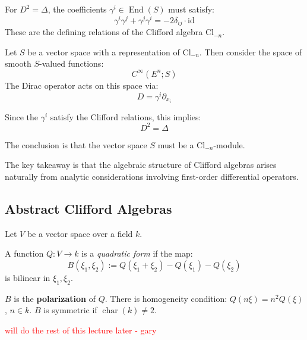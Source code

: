 For $D^2 = \Delta$, the coefficients $\gamma^i \in \operatorname{End}(S)$ must satisfy:
    \begin{equation}
    \gamma^i \gamma^j + \gamma^j \gamma^i = -2\delta_{ij} \cdot \mathrm{id} 
    \end{equation}
These are the defining relations of the Clifford algebra $\mathrm{Cl}_{-n}$.

Let $S$ be a vector space with a representation of $\mathrm{Cl}_{-n}$. Then consider the space of smooth $S$-valued functions:
    \[
    C^\infty(E^n; S)
    \]
The Dirac operator acts on this space via:
    \[
    D = \gamma^i \partial_{x_i}
    \]

Since the $\gamma^i$ satisfy the Clifford relations, this implies:
    \[
    D^2 = \Delta
    \]

The conclusion is that the vector space $S$ must be a $\mathrm{Cl}_{-n}$-module.

The key takeaway is that the algebraic structure of Clifford algebras arises naturally from analytic considerations involving first-order differential operators.

\subsection{Abstract Clifford Algebras}

Let $V$ be a vector space over a field $k$.

\begin{definition}
A function $Q: V \to k$ is a \emph{quadratic form} if the map:
\[
B(\xi_1, \xi_2) := Q(\xi_1 + \xi_2) - Q(\xi_1) - Q(\xi_2)
\]
is bilinear in $\xi_1, \xi_2$.
\end{definition}

$B$ is the \textbf{polarization} of $Q$. There is homogeneity condition: $Q(n\xi) = n^2 Q(\xi)$, $n \in k$. $B$ is symmetric if $\operatorname{char}(k) \ne 2$.

\textcolor{red}{will do the rest of this lecture later - gary}



